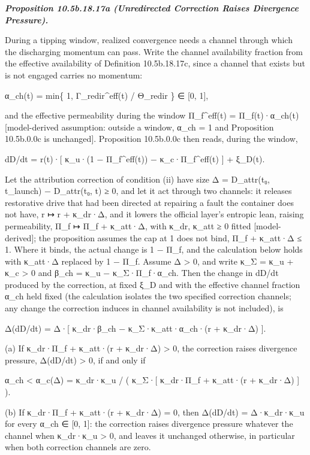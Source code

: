\documentclass[
]{article}
\begin{document}
\emph{\textbf{Proposition 10.5b.18.17a (Unredirected Correction Raises
Divergence Pressure).}}

During a tipping window, realized convergence needs a channel through
which the discharging momentum can pass. Write the channel availability
fraction from the effective availability of Definition 10.5b.18.17c,
since a channel that exists but is not engaged carries no momentum:

α\_ch(t) = min\{ 1, Γ\_redir\^{}eff(t) / Θ\_redir \} ∈ {[}0, 1{]},

and the effective permeability during the window Π\_f\^{}eff(t) =
Π\_f(t)·α\_ch(t) {[}model-derived assumption: outside a window, α\_ch =
1 and Proposition 10.5b.0.0c is unchanged{]}. Proposition 10.5b.0.0c
then reads, during the window,

dD/dt = r(t)·{[} κ\_u·(1 − Π\_f\^{}eff(t)) − κ\_c·Π\_f\^{}eff(t) {]} +
ξ\_D(t).

Let the attribution correction of condition (ii) have size Δ =
D\_attr(t₀, t\_launch) − D\_attr(t₀, t) ≥ 0, and let it act through two
channels: it releases restorative drive that had been directed at
repairing a fault the container does not have, r ↦ r + κ\_dr·Δ, and it
lowers the official layer's entropic lean, raising permeability, Π\_f ↦
Π\_f + κ\_att·Δ, with κ\_dr, κ\_att ≥ 0 fitted {[}model-derived{]}; the
proposition assumes the cap at 1 does not bind, Π\_f + κ\_att·Δ ≤ 1.
Where it binds, the actual change is 1 − Π\_f, and the calculation below
holds with κ\_att·Δ replaced by 1 − Π\_f. Assume Δ \textgreater{} 0, and
write κ\_Σ = κ\_u + κ\_c \textgreater{} 0 and β\_ch = κ\_u −
κ\_Σ·Π\_f·α\_ch. Then the change in dD/dt produced by the correction, at
fixed ξ\_D and with the effective channel fraction α\_ch held fixed (the
calculation isolates the two specified correction channels; any change
the correction induces in channel availability is not included), is

Δ(dD/dt) = Δ·{[} κ\_dr·β\_ch − κ\_Σ·κ\_att·α\_ch·(r + κ\_dr·Δ) {]}.

(a) If κ\_dr·Π\_f + κ\_att·(r + κ\_dr·Δ) \textgreater{} 0, the
correction raises divergence pressure, Δ(dD/dt) \textgreater{} 0, if and
only if

α\_ch \textless{} α\_c(Δ) = κ\_dr·κ\_u / ( κ\_Σ·{[} κ\_dr·Π\_f +
κ\_att·(r + κ\_dr·Δ) {]} ).

(b) If κ\_dr·Π\_f + κ\_att·(r + κ\_dr·Δ) = 0, then Δ(dD/dt) =
Δ·κ\_dr·κ\_u for every α\_ch ∈ {[}0, 1{]}: the correction raises
divergence pressure whatever the channel when κ\_dr·κ\_u \textgreater{}
0, and leaves it unchanged otherwise, in particular when both correction
channels are zero.
\end{document}
